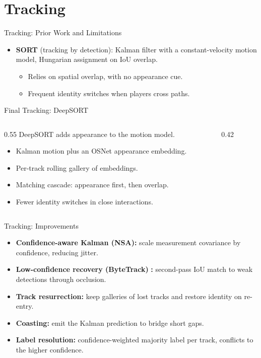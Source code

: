 \section{Tracking}
\label{sec:tracking}
\begin{frame}{Tracking: Prior Work and Limitations}
\begin{itemize}
  \item \textbf{SORT} \cite{sort} (tracking by detection): Kalman filter with a constant-velocity motion model, Hungarian assignment on IoU overlap.
  \begin{itemize}
    \item Relies on spatial overlap, with no appearance cue.
    \item Frequent identity switches when players cross paths.
  \end{itemize}
\end{itemize}
\end{frame}

\begin{frame}{Final Tracking: DeepSORT}
\begin{columns}[T]
  \begin{column}{0.55\textwidth}
    DeepSORT \cite{deepsort} adds appearance to the motion model.
    \begin{itemize}
      \item Kalman motion plus an OSNet \cite{reid} appearance embedding.
      \item Per-track rolling gallery of embeddings.
      \item Matching cascade: appearance first, then overlap.
      \item Fewer identity switches in close interactions.
    \end{itemize}
  \end{column}
  \begin{column}{0.42\textwidth}
    \videobox
  \end{column}
\end{columns}
\end{frame}

\begin{frame}{Tracking: Improvements}
\begin{itemize}
  \item \textbf{Confidence-aware Kalman (NSA):} scale measurement covariance by confidence, reducing jitter.
  \item \textbf{Low-confidence recovery (ByteTrack)} \cite{bytetrack}\textbf{:} second-pass IoU match to weak detections through occlusion.
  \item \textbf{Track resurrection:} keep galleries of lost tracks and restore identity on re-entry.
  \item \textbf{Coasting:} emit the Kalman prediction to bridge short gaps.
  \item \textbf{Label resolution:} confidence-weighted majority label per track, conflicts to the higher confidence.
\end{itemize}
\end{frame}
